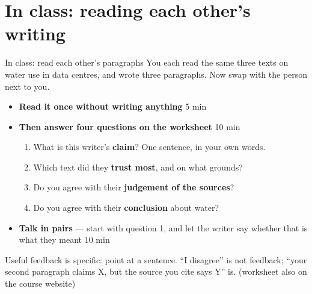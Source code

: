 \documentclass[aspectratio=169]{beamer}
\begin{document}
\section{In class: reading each other's writing}

\begin{frame}{In class: read each other's paragraphs}
You each read the same three texts on water use in data centres, and wrote
three paragraphs.  Now swap with the person next to you.
\begin{itemize}
  \item \textbf{Read it once without writing anything} \hfill 5 min
  \item \textbf{Then answer four questions on the worksheet} \hfill 10 min
    \begin{enumerate}
    \item What is this writer's \textbf{claim}?  One sentence, in your own words.
    \item Which text did they \textbf{trust most}, and on what grounds?
    \item Do you agree with their \textbf{judgement of the sources}?
    \item Do you agree with their \textbf{conclusion} about water?
    \end{enumerate}
  \item \textbf{Talk in pairs} --- start with question 1, and let the writer
    say whether that is what they meant \hfill 10 min
\end{itemize}
\vspace{1ex}
Useful feedback is specific: point at a sentence.  ``I disagree'' is not
feedback; ``your second paragraph claims X, but the source you cite says Y''
is.  \hfill {\footnotesize (worksheet also on the course website)}
\end{frame}
\end{document}
